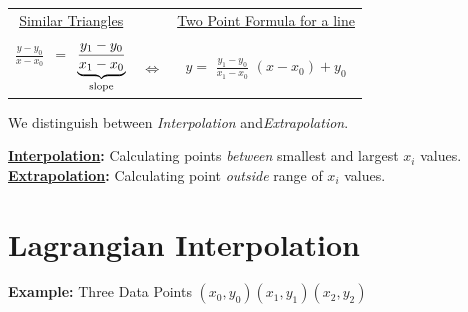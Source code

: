 \documentclass[a4paper,12pt,]{report}
\begin{document}
\begin{center}
\begin{tabular}{ccc}
	\underline{Similar Triangles}&&\underline{Two Point Formula for a line}\\ \\
	\Large{$\frac{y-y_0}{x-x_0}$}\, \normalsize{$=$} \,{$\underbrace{\Large{\frac{y_1-y_0}{x_1-x_0}}}_{\text{slope}}$}
		& \Large{$\Leftrightarrow$}
		& $y =$ \Large{$\frac{y_1-y_0}{x_1-x_0}$}\!\! \normalsize{$(x-x_0) + y_0$}\\
	
\end{tabular}
\end{center}

	We distinguish between \textit{Interpolation} and\textit{Extrapolation}.

\begin{center}
\fbox
{
	\parbox{0.8\textwidth}
	{
			\textbf{\underline{Interpolation}:} Calculating points \textit{between} smallest and largest $x_i$ values.\\
			\textbf{\underline{Extrapolation}:} Calculating point \textit{outside} range of $x_i$ values.\\
	
	}
}
\end{center}

\section{Lagrangian Interpolation}


	\noindent \textbf{Example:} Three Data Points $(x_0,y_0)(x_1,y_1)(x_2,y_2)$
\end{document}
